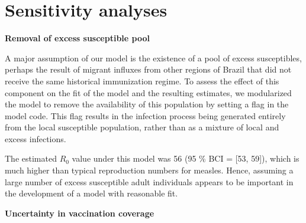 \appendix

\section{Sensitivity analyses}

\textbf{Removal of excess susceptible pool}

A major assumption of our model is the existence of a pool of excess susceptibles, perhaps the result of migrant influxes from other regions of Brazil that did not receive the same historical immunization regime. To assess the effect of this component on the fit of the model and the resulting estimates, we modularized the model to remove the availability of this population by setting a flag in the model code. This flag results in the infection process being generated entirely from the local susceptible population, rather than as a mixture of local and excess infections.

The estimated $R_0$ value under this model was 56 (95 \% BCI = [53, 59]), which is much higher than typical reproduction numbers for measles. Hence, assuming a large number of excess susceptible adult individuals appears to be important in the development of a model with reasonable fit.

\textbf{Uncertainty in vaccination coverage}

